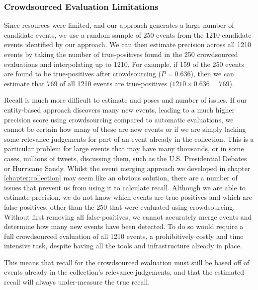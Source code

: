 \subsubsection{Crowdsourced Evaluation Limitations}
Since resources were limited, and our approach generates a large number of candidate events, we use a random sample of 250 events from the 1210 candidate events identified by our approach.
We can then estimate precision across all 1210 events by taking the number of true-positives found in the 250 crowdsourced evaluations and interpolating up to 1210.
For example, if 159 of the 250 events are found to be true-positives after crowdsourcing ($P = 0.636$), then we can estimate that 769 of all 1210 events are true-positives ($1210 \times 0.636 = 769$).

Recall is much more difficult to estimate and poses and number of issues.
If our entity-based approach discovers many new events, leading to a much higher precision score using crowdsourcing compared to automatic evaluations, we cannot be certain how many of these are new events or if we are simply lacking some relevance judgements for part of an event already in the collection.
This is a particular problem for large events that may have many thousands, or in some cases, millions of tweets, discussing them, such as the U.S. Presidential Debates or Hurricane Sandy.
Whilst the event merging approach we developed in chapter \ref{chapter:collection} may seem like an obvious solution, there are a number of issues that prevent us from using it to calculate recall.
Although we are able to estimate precision, we do not know which events are true-positives and which are false-positives, other than the 250 that were evaluated using crowdsourcing.
Without first removing all false-positives, we cannot accurately merge events and determine how many new events have been detected.
To do so would require a full crowdsourced evaluation of all 1210 events, a prohibitively costly and time intensive task, despite having all the tools and infrastructure already in place.

This means that recall for the crowdsourced evaluation must still be based off of events already in the collection's relevance judgements, and that the estimated recall will always under-measure the true recall.